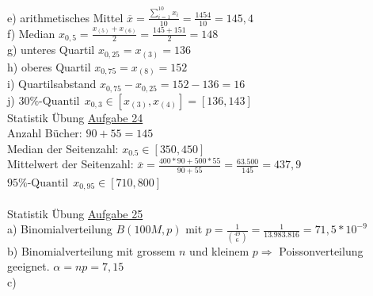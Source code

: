 \documentclass[12pt]{article} %
\newcommand{\aufgabe}[1]{{\huge Statistik Übung \underline{Aufgabe #1}}\\[3.5ex]  }
\begin{document}
e) arithmetisches Mittel $\overline{x} = \frac{\sum_{i=1}^{10}{x_i}}{10} = \frac{1454}{10} = 145,4 $\\[0.4cm]
f) Median $x_{0,5} = \frac{x_{(5)} + x_{(6)}}{2} = \frac{145 + 151}{2} = 148$ \\[0.4cm]
g) unteres Quartil $x_{0,25} = x_{(3)} = 136$ \\[0.4cm]
h) oberes Quartil $x_{0,75} = x_{(8)} = 152$ \\[0.4cm]
i) Quartilsabstand $x_{0,75} - x_{0,25} = 152 - 136 = 16$ \\[0.4cm]
j) $30\%\text{-Quantil} ~~ x_{0,3} \in [x_{(3)}, x_{(4)}] = [136, 143]$ \\[0.4cm]
\newpage
\aufgabe{24}
Anzahl Bücher: $90 + 55 = 145$ \\
Median der Seitenzahl: $x_{0.5} \in [350, 450]$ \\
Mittelwert der Seitenzahl: $\overline{x} = \frac{400 * 90 + 500 * 55}{90+55} = \frac{63.500}{145} = 437,9$ \\ 
$95\%\text{-Quantil} ~~ x_{0,95} \in [710, 800]$ \\[1ex]
\- \dotfill 
\\[4ex]
\aufgabe{25}
a) Binomialverteilung $B(100M, p)$ mit $p = \frac{1}{\binom{49}{6}} = \frac{1}{13.983.816} = 71,5 *10^{-9}$ \\
b) Binomialverteilung mit grossem $n$ und kleinem $p \Longrightarrow $  Poissonverteilung geeignet. $\alpha = np = 7,15$  \\
c) 
\end{document}
